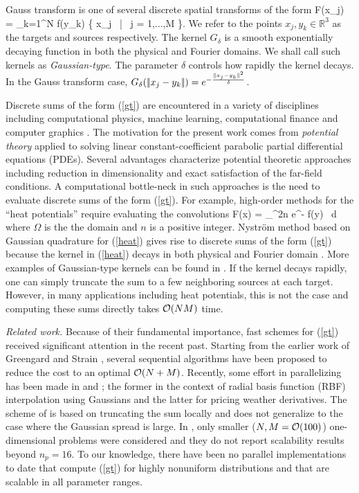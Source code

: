 
Gauss transform is one of several discrete spatial transforms of the form 
%
\beq F(x_j) = \sum_{k=1}^N  f(y_k) \quad {} \quad \{ x_j \, | \, j = 1,...,M \}.  \label{gt} \eeq
%
We refer to the points $ x_j, y_k \in \mathbb{R}^3 $ as the targets and sources respectively. The kernel $G_\delta$ is a smooth exponentially decaying function in both the physical and Fourier domains. We shall call such kernels as {\em Gaussian-type}. The parameter $\delta$ controls how rapidly the kernel decays.  In the Gauss transform case, $G_\delta (|\!| x_j - y_k |\!|) = e^{-\frac{|\!| x_j - y_k |\!|^2}{\delta}}$. 

Discrete sums of the form (\ref{gt}) are encountered in a variety of disciplines including computational physics,
 machine learning, computational finance and computer graphics \cite{strain94adap, elgammal03, broadie03, kim05, veerapaneni08}. The motivation for the present work comes from {\em potential theory} \cite{kress99} applied to  solving linear constant-coefficient parabolic partial differential equations (PDEs). Several advantages characterize potential theoretic approaches including reduction in dimensionality and exact satisfaction of the far-field conditions. A computational bottle-neck in such approaches is the need to evaluate discrete sums of the form (\ref{gt}). For example, high-order methods for the ``heat potentials'' require evaluating the convolutions \cite{li09, skv09}
% 
\beq F(x) = \int_\Omega {}^{2n} e^{-} f(y) \, d\Omega \label{heat} \eeq
% 
where $\Omega$ is the the domain and $n$ is a positive integer. Nystr\"{o}m method based on Gaussian quadrature for (\ref{heat}) gives rise to discrete sums of the form (\ref{gt}) because the kernel in (\ref{heat}) decays in both physical and Fourier domain \cite{fggt}. More examples of Gaussian-type kernels can be found in \cite{victor03}. If the kernel decays rapidly, one can simply truncate the sum to a few neighboring sources at each target. However, in many applications including heat potentials, this is not the case and computing these sums directly takes $\mathcal{O}(NM)$ time. 

{\em Related work.} Because of their fundamental importance, fast schemes for (\ref{gt}) received significant attention in the recent past. Starting from the earlier work of Greengard and Strain \cite{fgt}, several sequential algorithms \cite{greengard98, sun02, duraiswami03, tausch09, fggt} have been proposed to reduce the cost to an optimal $\mathcal{O}(N+M)$. Recently, some effort in parallelizing has been made in \cite{rio09} and \cite{yusaku06}; the former in the context of radial basis function (RBF) interpolation using Gaussians and the latter for pricing weather derivatives. The scheme of \cite{rio09} is based on truncating the sum locally and does not generalize to the case where the Gaussian spread is large. In \cite{yusaku06}, only smaller ($N, M = \mathcal{O}(100)$) one-dimensional problems were considered and they do not report scalability results beyond $n_p = 16$. 
To our knowledge, there have been no parallel implementations to date that compute (\ref{gt}) for highly nonuniform distributions and that are scalable in all parameter ranges. 

